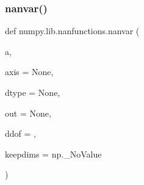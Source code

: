  \mbox{\label{namespacenumpy_1_1lib_1_1nanfunctions_aa74b1b732ed44e858f6610c2f8e09836}} 
\subsubsection{\texorpdfstring{nanvar()}{nanvar()}}
{\footnotesize\ttfamily def numpy.\+lib.\+nanfunctions.\+nanvar (\begin{DoxyParamCaption}\item[{}]{a,  }\item[{}]{axis = {\ttfamily None},  }\item[{}]{dtype = {\ttfamily None},  }\item[{}]{out = {\ttfamily None},  }\item[{}]{ddof = {},  }\item[{}]{keepdims = {\ttfamily np.\+\_\+NoValue} }\end{DoxyParamCaption})}

